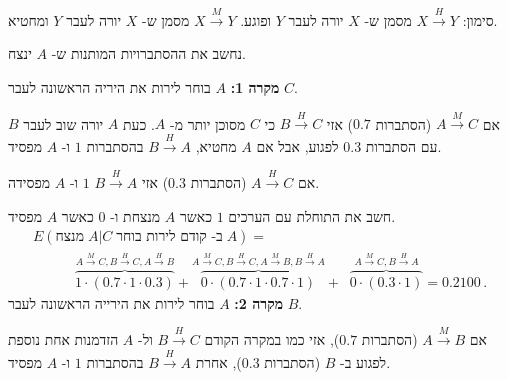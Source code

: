 סימון:
$X\stackrel{H}{\longrightarrow}Y$
מסמן ש-%
$X$
יורה לעבר
$Y$
ופוגע.
$X\stackrel{M}{\longrightarrow}Y$
מסמן ש-%
$X$
יורה לעבר
$Y$
ומחטיא.

נחשב את ההסתברויות המותנות ש-%
$A$
ינצח.

\textbf{מקרה 1:} 
$A$
בוחר לירות את היריה הראשונה לעבר 
$C$.

אם 
$A\stackrel{M}{\longrightarrow}C$
(הסתברות
$0.7$)
אזי
$B\stackrel{H}{\longrightarrow}C$
כי
$C$
מסוכן יותר מ-%
$A$.
כעת
$A$
יורה שוב לעבר 
$B$
עם הסתברות
$0.3$
לפגוע, אבל אם
$A$
מחטיא,
$B\stackrel{H}{\longrightarrow}A$
בהסתברות
$1$
ו-%
$A$
מפסיד.

אם
$A\stackrel{H}{\longrightarrow}C$
(הסתברות
$0.3$)
אזי
$B\stackrel{H}{\longrightarrow}A$
$1$
ו-%
$A$
מפסידה.

חשב את התוחלת עם הערכים
$1$
כאשר 
$A$
מנצחת ו-%
$0$
כאשר
$A$ 
מפסיד.
\vspace*{-3ex}
\[
\renewcommand*{\arraystretch}{2.5}
\begin{array}{l}
E(\textrm{מנצח}\;A|C\;\textrm{ב- קודם לירות בוחר}\;A) =\\
%
\qquad\quad \overbrace{1\cdot (0.7\cdot 1\cdot 0.3)}%
^{A\stackrel{M}{\longrightarrow}C, 
B\stackrel{H}{\longrightarrow}C,
A\stackrel{H}{\longrightarrow}B}+
%
\overbrace{0\cdot (0.7\cdot 1\cdot 0.7\cdot 1)}%
^{A\stackrel{M}{\longrightarrow}C,
B\stackrel{H}{\longrightarrow}C,
A\stackrel{M}{\longrightarrow}B,
B\stackrel{H}{\longrightarrow}A}+
%
\;\;\overbrace{0\cdot (0.3\cdot 1)}^{A\stackrel{M}{\longrightarrow}C, B\stackrel{H}{\longrightarrow}A}=0.2100\,.
\end{array}
\]
\textbf{מקרה 2:} $A$
בוחר לירות את הירייה הראשונה לעבר 
$B$.

אם
$A\stackrel{M}{\longrightarrow}B$
(הסתברות
$0.7$),
אזי כמו במקרה הקודם
$B\stackrel{H}{\longrightarrow}C$
ול-%
$A$
הזדמנות אחת נוספת לפגוע ב-%
$B$
(הסתברות
$0.3$),
אחרת
$B\stackrel{H}{\longrightarrow}A$
בהסתברות
$1$
ו-%
$A$
מפסיד.

